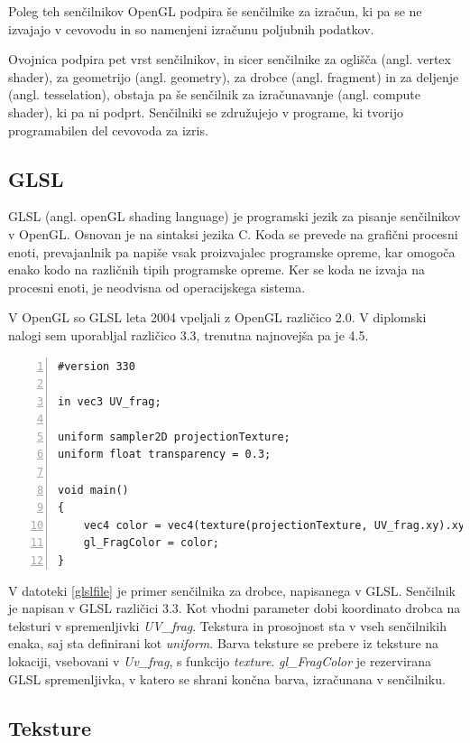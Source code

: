 \documentclass[a4paper, 12pt]{book}
\begin{document}
Poleg teh senčilnikov OpenGL podpira še senčilnike za izračun, ki pa se ne izvajajo v cevovodu in so namenjeni izračunu poljubnih podatkov.

Ovojnica podpira pet vrst senčilnikov, in sicer senčilnike za oglišča (angl. vertex shader), za geometrijo (angl. geometry), za drobce (angl. fragment) in za deljenje (angl. tesselation), obstaja pa še senčilnik za izračunavanje (angl. compute shader), ki pa ni podprt. Senčilniki se združujejo v programe, ki tvorijo programabilen del cevovoda za izris.

\subsection{GLSL}

GLSL (angl. openGL shading language) je programski jezik za pisanje sen\-čil\-nik\-ov v OpenGL. Osnovan je na sintaksi jezika C. Koda se prevede na grafični procesni enoti, prevajanlnik pa napiše vsak proizvajalec programske opreme, kar omogoča enako kodo na različnih tipih programske opreme. Ker se koda ne izvaja na procesni enoti, je neodvisna od operacijskega sistema.

V OpenGL so GLSL leta 2004 vpeljali z OpenGL različico 2.0. V diplomski nalogi sem uporabljal različico 3.3, trenutna najnovejša pa je 4.5. 
{\footnotesize
\begin{lstlisting}[captionpos=b, frame=single, caption={Primer preprostega senčilnika za drobce.}, breaklines=true, firstline=1, numbers=left, label={glslfile}]
#version 330

in vec3 UV_frag; 

uniform sampler2D projectionTexture;
uniform float transparency = 0.3;

void main()
{
	vec4 color = vec4(texture(projectionTexture, UV_frag.xy).xyz, transparency);
	gl_FragColor = color;
}	
\end{lstlisting}
}
V datoteki \ref{glslfile} je primer senčilnika za drobce, napisanega v GLSL. Senčilnik je napisan v GLSL različici 3.3. Kot vhodni parameter dobi koordinato drobca na teksturi v spremenljivki \emph{UV\_frag}. Tekstura in prosojnost sta v vseh senčilnikih enaka, saj sta definirani kot \emph{uniform}. Barva teksture se prebere iz teksture na lokaciji, vsebovani v \emph{Uv\_frag}, s funkcijo \emph{texture}. \emph{gl\_FragColor} je rezervirana GLSL spremenljivka, v katero se shrani končna barva, izračunana v senčilniku.
\subsection*{Teksture}
\end{document}
